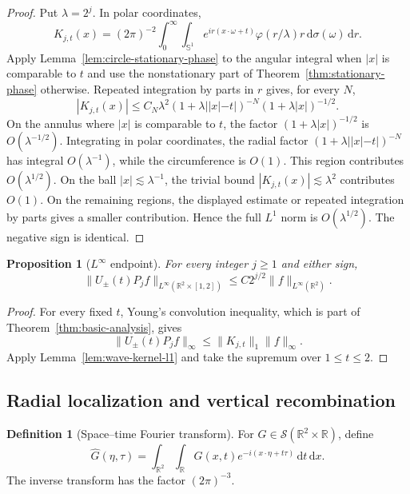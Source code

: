 \documentclass[11pt]{article}
\numberwithin{equation}{section}
\newtheorem{proposition}[theorem]{Proposition}
\theoremstyle{definition}
\newtheorem{definition}[theorem]{Definition}
\theoremstyle{remark}
\newcommand{\R}{\mathbb R}
\newcommand{\Sph}{\mathbb S}
\newcommand{\Sch}{\mathcal S}
\newcommand{\dd}{\,\mathrm d}
\begin{document}
\begin{proof}
Put $\lambda=2^j$.  In polar coordinates,
\[
K_{j,t}(x)=(2\pi)^{-2}\int_0^\infty\int_{\Sph^1}e^{ir(x\cdot\omega+t)}\varphi(r/\lambda)r\dd\sigma(\omega)\dd r.
\]
Apply Lemma~\ref{lem:circle-stationary-phase} to the angular integral when $|x|$ is comparable to $t$ and use the nonstationary part of Theorem~\ref{thm:stationary-phase} otherwise.  Repeated integration by parts in $r$ gives, for every $N$,
\[
|K_{j,t}(x)|\le C_N\lambda^2(1+\lambda||x|-t|)^{-N}(1+\lambda|x|)^{-1/2}.
\]
On the annulus where $|x|$ is comparable to $t$, the factor $(1+\lambda|x|)^{-1/2}$ is $O(\lambda^{-1/2})$.  Integrating in polar coordinates, the radial factor $(1+\lambda||x|-t|)^{-N}$ has integral $O(\lambda^{-1})$, while the circumference is $O(1)$.  This region contributes $O(\lambda^{1/2})$.  On the ball $|x|\lesssim\lambda^{-1}$, the trivial bound $|K_{j,t}(x)|\lesssim\lambda^2$ contributes $O(1)$.  On the remaining regions, the displayed estimate or repeated integration by parts gives a smaller contribution.  Hence the full $L^1$ norm is $O(\lambda^{1/2})$.  The negative sign is identical.
\end{proof}

\begin{proposition}[$L^\infty$ endpoint]\label{prop:mss-linfty-endpoint}
For every integer $j\ge1$ and either sign,
\[
\|U_\pm(t)P_jf\|_{L^\infty(\R^2\times[1,2])}\le C2^{j/2}\|f\|_{L^\infty(\R^2)}.
\]
\end{proposition}

\begin{proof}
For every fixed $t$, Young's convolution inequality, which is part of Theorem~\ref{thm:basic-analysis}, gives
\[
\|U_\pm(t)P_jf\|_\infty\le\|K_{j,t}\|_1\|f\|_\infty.
\]
Apply Lemma~\ref{lem:wave-kernel-l1} and take the supremum over $1\le t\le2$.
\end{proof}

\subsection{Radial localization and vertical recombination}

\begin{definition}[Space--time Fourier transform]\label{def:spacetime-fourier}
For $G\in\Sch(\R^2\times\R)$, define
\[
\widehat G(\eta,\tau)=\int_{\R^2}\int_\R G(x,t)e^{-i(x\cdot\eta+t\tau)}\dd t\dd x.
\]
The inverse transform has the factor $(2\pi)^{-3}$.
\end{definition}
\end{document}
